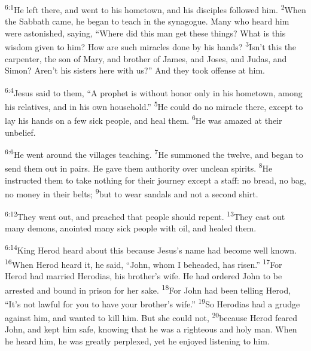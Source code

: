 \documentclass[openany,12pt,english]{book}
\newenvironment{para}{\par\pretolerance=100\tolerance=200\setlength{\emergencystretch}{0.6em}\relax}{\par}
\begin{document}
\bigskip{}

\begin{para}
    \textsuperscript{6:1}\thinspace{}He left there, and went to his home\-town, and his disciples followed him.
    \textsuperscript{2}\thinspace{}When the Sabbath came, he be\-gan to teach in the syn\-a\-gogue. Man\-y who heard him were astonished, say\-ing, “Where did this man get these things? What is this wis\-dom giv\-en to him? How are such miracles done by his hands?
    \textsuperscript{3}\thinspace{}Is\-n't this the car\-pen\-ter, the son of Mar\-y, and broth\-er of James, and Joses, and Ju\-das, and Simon? Aren't his sisters here with us?” And they took of\-fense at him.
\end{para}

\begin{para}
    \textsuperscript{6:4}\thinspace{}Jesus said to them, “A proph\-et is with\-out hon\-or on\-ly in his home\-town, a\-mong his relatives, and in his own house\-hold.”
    \textsuperscript{5}\thinspace{}He could do no mir\-a\-cle there, ex\-cept to lay his hands on a few sick peo\-ple, and heal them.
    \textsuperscript{6}\thinspace{}He was a\-mazed at their un\-be\-lief.
\end{para}

\bigskip{}

\begin{para}
    \textsuperscript{6:6}\thinspace{}He went a\-round the villages teach\-ing.
    \textsuperscript{7}\thinspace{}He summoned the twelve, and be\-gan to send them out in pairs. He gave them au\-thor\-i\-ty o\-ver un\-clean spirits.
    \textsuperscript{8}\thinspace{}He instructed them to take noth\-ing for their jour\-ney ex\-cept a staff: no bread, no bag, no mon\-ey in their belts;
    \textsuperscript{9}\thinspace{}but to wear sandals and not a sec\-ond shirt.
\end{para}

\begin{para}
    \textsuperscript{6:12}\thinspace{}They went out, and preached that peo\-ple should re\-pent.
    \textsuperscript{13}\thinspace{}They cast out man\-y demons, anointed man\-y sick peo\-ple with oil, and healed them.
\end{para}

\bigskip{}

\begin{para}
    \textsuperscript{6:14}\thinspace{}King Her\-od heard a\-bout this be\-cause Jesus's name had be\-come well known.
    \textsuperscript{16}\thinspace{}When Her\-od heard it, he said, “John, whom I beheaded, has ris\-en.”
    \textsuperscript{17}\thinspace{}For Her\-od had mar\-ried Herodias, his brother's wife. He had ordered John to be arrested and bound in pris\-on for her sa\-ke.
    \textsuperscript{18}\thinspace{}For John had been tell\-ing Her\-od, “It's not law\-ful for you to have your brother's wife.”
    \textsuperscript{19}\thinspace{}So Herodias had a grudge a\-gainst him, and wanted to kill him. But she could not,
    \textsuperscript{20}\thinspace{}be\-cause Her\-od feared John, and kept him safe, know\-ing that he was a right\-eous and ho\-ly man. When he heard him, he was great\-ly per\-plexed, yet he enjoyed listening to him.
\end{para}
\end{document}
